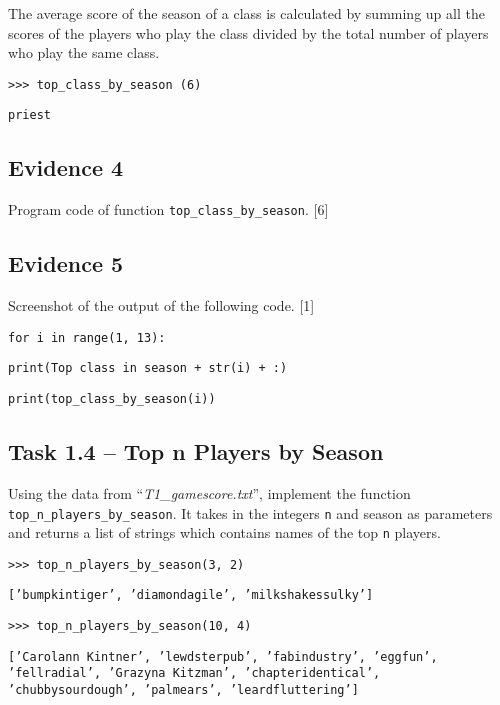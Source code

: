 The average score of the season of a class is calculated by summing
up all the scores of the players who play the class divided by the
total number of players who play the same class.

\noindent\begin{minipage}[t]{1\columnwidth}%
\texttt{>\textcompwordmark >\textcompwordmark > top\_class\_by\_season
(6) }

\texttt{\textquotedbl priest\textquotedbl{} }%
\end{minipage}

\subsection*{Evidence 4}

Program code of function \texttt{top\_class\_by\_season}. \hfill{}{[}6{]}

\subsection*{Evidence 5 }

Screenshot of the output of the following code. \hfill{}{[}1{]}

\noindent\begin{minipage}[t]{1\columnwidth}%
\texttt{for i in range(1, 13): }

\texttt{\qquad{}print(\textquotedbl Top class in season \textquotedbl{}
+ str(i) + \textquotedbl :\textquotedbl ) }

\texttt{\qquad{}print(top\_class\_by\_season(i)) }%
\end{minipage}

\subsection*{Task 1.4 -- Top n Players by Season }

Using the data from \textquotedblleft \emph{T1\_gamescore.txt}\textquotedblright ,
implement the function \texttt{top\_n\_players\_by\_season}. It takes
in the integers \texttt{n} and season as parameters and returns a
list of strings which contains names of the top \texttt{n} players. 

\noindent\begin{minipage}[t]{1\columnwidth}%
\texttt{>\textcompwordmark >\textcompwordmark > top\_n\_players\_by\_season(3,
2) }

\texttt{{[}'bumpkintiger', 'diamondagile', 'milkshakessulky'{]} }

\texttt{>\textcompwordmark >\textcompwordmark > top\_n\_players\_by\_season(10,
4) }

\texttt{{[}'Carolann Kintner', 'lewdsterpub', 'fabindustry', 'eggfun',
'fellradial', 'Grazyna Kitzman', 'chapteridentical', 'chubbysourdough',
'palmears', 'leardfluttering'{]} }%
\end{minipage}


